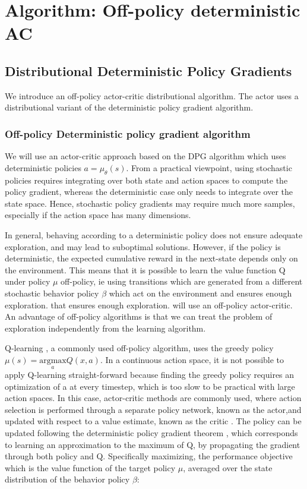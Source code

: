 \chapter{Algorithm: Off-policy deterministic AC}
\label{sec:algo}
\section{Distributional Deterministic Policy Gradients}

We introduce an off-policy actor-critic distributional algorithm.
The actor uses a distributional variant of the deterministic policy gradient algorithm.

\subsection{Off-policy Deterministic policy gradient algorithm}
We will use an actor-critic approach based on the DPG algorithm \cite{silver2014b}
which uses deterministic policies $a=\mu_{\theta}(s)$.
From a practical viewpoint, using stochastic policies requires integrating over both
state and action spaces to compute the policy gradient, whereas the deterministic case
only needs to integrate over the state space. Hence, stochastic policy gradients
may require much more samples, especially if the action space has many dimensions.

In general, behaving according to a deterministic policy does not ensure adequate exploration,
and may lead to suboptimal solutions. 
However, if the policy is deterministic, the expected cumulative reward in the next-state
depends only on the environment. This means that it is possible to learn the value function
Q under policy $\mu$ off-policy, ie using transitions which are generated from a different stochastic
behavior policy $\beta$ which act on the environment and ensures enough exploration.
that ensures enough exploration. will use an off-policy actor-critic.
An advantage of off-policy algorithms is that we can treat the problem of exploration
independently from the learning algorithm.

Q-learning \cite{Watkins1992}, a commonly used off-policy algorithm, uses the greedy policy
$\mu(s)=\underset{a}{\text{argmax}} Q(x,a)$.
In  a  continuous  action  space, it is not possible to apply Q-learning straight-forward because finding the 
greedy policy requires an optimization of a at every timestep, which is too slow to be practical with large action spaces.
In this case, actor-critic methods are commonly used, where action selection is performed through a
separate policy network, known as the actor,and updated with respect to a value estimate,
known as the critic \cite{Sutton1998}.
The policy can be updated following the deterministic policy gradient theorem \cite{silver2014b},
which corresponds to learning an approximation to the maximum of Q,
by propagating the gradient through both policy and Q.
Specifically maximizing, the performance objective which is the value function of the target policy $\mu$, averaged over the state
distribution of the behavior policy $\beta$:

